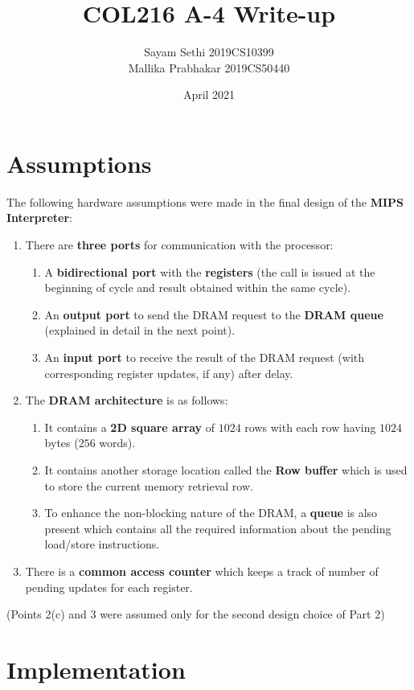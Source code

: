 \documentclass{article}
\title{COL216 A-4 Write-up}
\author{Sayam Sethi 2019CS10399 \\ Mallika Prabhakar 2019CS50440 }
\date{April 2021}
\begin{document}
\maketitle

\section{Assumptions}
The following hardware assumptions were made in the final design of the \textbf{MIPS Interpreter}:
\begin{enumerate}
    \item There are \textbf{three ports} for communication with the processor:
        \begin{enumerate}
            \item A \textbf{bidirectional port} with the \textbf{registers} (the call is issued at the beginning of cycle and result obtained within the same cycle).
            \item An \textbf{output port} to send the DRAM request to the \textbf{DRAM queue} (explained in detail in the next point).
            \item An \textbf{input port} to receive the result of the DRAM request (with corresponding register updates, if any) after delay.
        \end{enumerate}
    \item The \textbf{DRAM architecture} is as follows:
        \begin{enumerate}
            \item It contains a \textbf{2D square array} of $1024$ rows with each row having $1024$ bytes ($256$ words).
            \item It contains another storage location called the \textbf{Row buffer} which is used to store the current memory retrieval row.
            \item To enhance the non-blocking nature of the DRAM, a \textbf{queue} is also present which contains all the required information about the pending load/store instructions.
        \end{enumerate}
    \item There is a \textbf{common access counter} which keeps a track of number of pending updates for each register.
\end{enumerate}
(Points 2(c) and 3 were assumed only for the second design choice of Part 2)


\section{Implementation}
\end{document}
